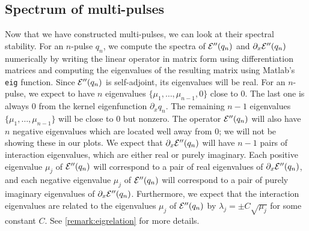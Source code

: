 \documentclass[thesis2.tex]{subfiles}
\begin{document}
\subsection{Spectrum of multi-pulses}

Now that we have constructed multi-pulses, we can look at their spectral stability. For an $n$-pulse $q_n$, we compute the spectra of $\mathcal{E}''(q_n)$ and $\partial_x \mathcal{E}''(q_n)$ numerically by writing the linear operator in matrix form using differentiation matrices and computing the eigenvalues of the resulting matrix using Matlab's \texttt{eig} function. Since $\mathcal{E}''(q_n)$ is self-adjoint, its eigenvalues will be real. For an $n$-pulse, we expect to have $n$ eigenvalues $\{ \mu_1, \dots, \mu_{n-1}, 0 \}$ close to 0. The last one is always 0 from the kernel eigenfunction $\partial_x q_n$. The remaining $n-1$ eigenvalues $\{\mu_1, \dots, \mu_{n-1}\}$ will be close to 0 but nonzero. The operator $\mathcal{E}''(q_n)$ will also have $n$ negative eigenvalues which are located well away from 0; we will not be showing these in our plots. We expect that $\partial_x \mathcal{E}''(q_n)$ will have $n-1$ pairs of interaction eigenvalues, which are either real or purely imaginary. Each positive eigenvalue $\mu_j$ of $\mathcal{E}''(q_n)$ will correspond to a pair of real eigenvalues of $\partial_x \mathcal{E}''(q_n)$, and each negative eigenvalue $\mu_j$ of $\mathcal{E}''(q_n)$ will correspond to a pair of purely imaginary eigenvalues of $\partial_x \mathcal{E}''(q_n)$. Furthermore, we expect that the interaction eigenvalues are related to the eigenvalues $\mu_j$ of $\mathcal{E}''(q_n)$ by $\lambda_j = \pm C \sqrt{\mu_j}$ for some constant $C$. See \cref{remark:eigrelation} for more details.
\end{document}
